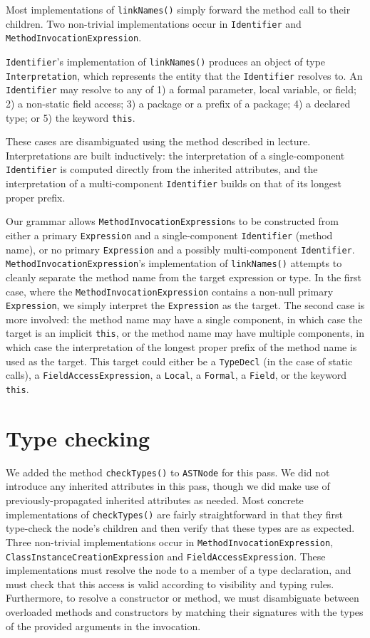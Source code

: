 \documentclass[12pt]{article}
\newcommand{\code}[1]{\texttt{#1}}
\begin{document}
Most implementations of \code{linkNames()} simply forward the method call to their children.  Two non-trivial implementations occur in \code{Identifier} and \code{MethodInvocationExpression}.

\code{Identifier}'s implementation of \code{linkNames()} produces an object of type \code{Interpretation}, which represents the entity that the \code{Identifier} resolves to. An \code{Identifier} may resolve to any of 1) a formal parameter, local variable, or field; 2) a non-static field access; 3) a package or a prefix of a package; 4) a declared type; or 5) the keyword \code{this}. 

These cases are disambiguated using the method described in lecture.  Interpretations are built inductively: the interpretation of a single-component \code{Identifier} is computed directly from the inherited attributes, and the interpretation of a multi-component \code{Identifier} builds on that of its longest proper prefix.

Our grammar allows \code{MethodInvocationExpression}s to be constructed from either a primary \code{Expression} and a single-component \code{Identifier} (method name), or no primary \code{Expression} and a possibly multi-component \code{Identifier}. \code{MethodInvocationExpression}'s implementation of \code{linkNames()} attempts to cleanly separate the method name from the target expression or type. In the first case, where the \code{MethodInvocationExpression} contains a non-null primary \code{Expression}, we simply interpret the \code{Expression} as the target. The second case is more involved: the method name may have a single component, in which case the target is an implicit \code{this}, or the method name may have multiple components, in which case the interpretation of the longest proper prefix of the method name is used as the target. This target could either be a \code{TypeDecl} (in the case of static calls), a \code{FieldAccessExpression}, a \code{Local}, a \code{Formal}, a \code{Field}, or the keyword \code{this}.

\section{Type checking}

We added the method \code{checkTypes()} to \code{ASTNode} for this pass. We did not introduce any inherited attributes in this pass, though we did make use of previously-propagated inherited attributes as needed. Most concrete implementations of \code{checkTypes()} are fairly straightforward in that they first type-check the node's children and then verify that these types are as expected.  Three non-trivial implementations occur in \code{MethodInvocationExpression}, \code{ClassInstanceCreationExpression} and \code{FieldAccessExpression}.  These implementations must resolve the node to a member of a type declaration, and must check that this access is valid according to visibility and typing rules. Furthermore, to resolve a constructor or method, we must disambiguate between overloaded methods and constructors by matching their signatures with the types of the provided arguments in the invocation.
\end{document}
